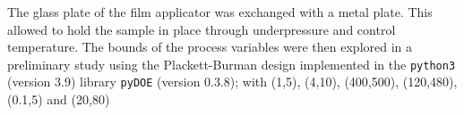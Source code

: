 %
The glass plate of the film applicator was exchanged with a metal plate.
This allowed to hold the sample in place through underpressure and control temperature. 
The bounds of the process variables were then explored in a preliminary study 
using the Plackett-Burman\cite{Plackett1946} design implemented in the \texttt{python3} (version 3.9)
library \texttt{pyDOE} (version 0.3.8); 
with 
(1,5), (4,10), (400,500), (120,480), (0.1,5) and  (20,80) 
